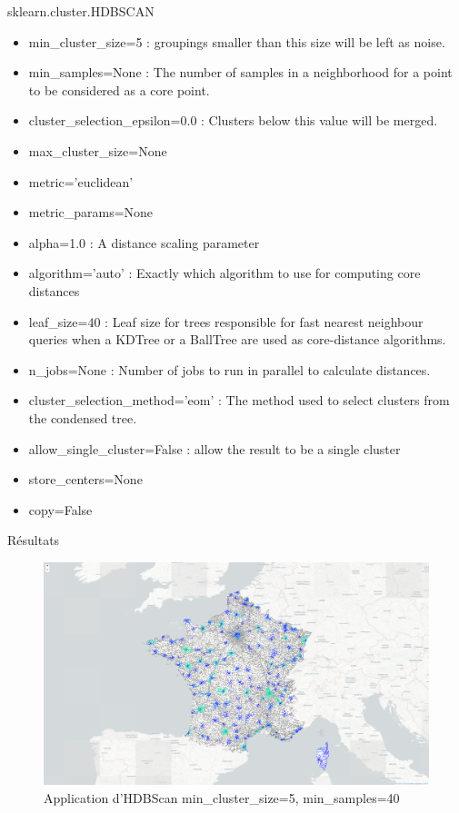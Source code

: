 \begin{frame}{sklearn.cluster.HDBSCAN}
    \begin{itemize}
        \item min\_cluster\_size=5 : groupings smaller than this size will be left as noise.
        \item min\_samples=None : The number of samples in a neighborhood for a point to be considered as a core point.
        \item cluster\_selection\_epsilon=0.0 : Clusters below this value will be merged.
        \item max\_cluster\_size=None
        \item metric='euclidean'
        \item metric\_params=None
        \item alpha=1.0 : A distance scaling parameter
        \item algorithm='auto' : Exactly which algorithm to use for computing core distances
        \item leaf\_size=40 : Leaf size for trees responsible for fast nearest neighbour queries when a KDTree or a BallTree are used as core-distance algorithms.
        \item n\_jobs=None : Number of jobs to run in parallel to calculate distances.
        \item cluster\_selection\_method='eom' : The method used to select clusters from the condensed tree.
        \item allow\_single\_cluster=False : allow the result to be a single cluster
        \item store\_centers=None
        \item copy=False

    \end{itemize}
\end{frame}

\begin{frame}{Résultats}
    \begin{figure}
        \includegraphics[width=0.9\paperheight]{images/villes_HDBSCAN.png}
        \caption{\label{fig:HDBSCAN}Application d'HDBScan min\_cluster\_size=5, min\_samples=40}
    \end{figure}
\end{frame}



